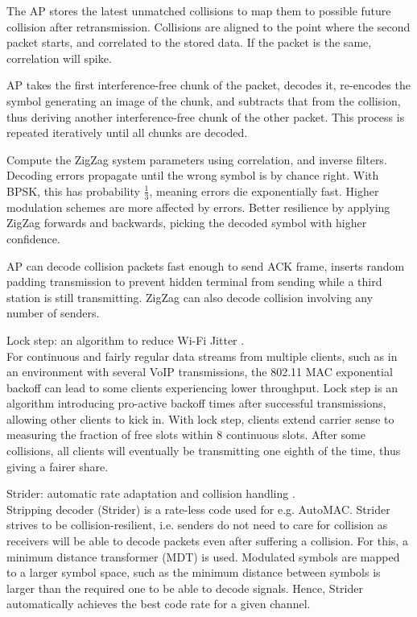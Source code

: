 The AP stores the latest unmatched collisions to map them to possible future collision after retransmission. Collisions are aligned to the point where the second packet starts, and correlated to the stored data. If the packet is the same, correlation will spike.

AP takes the first interference-free chunk of the packet, decodes it, re-encodes the symbol generating an image of the chunk, and subtracts that from the collision, thus deriving another interference-free chunk of the other packet. This process is repeated iteratively until all chunks are decoded.

Compute the ZigZag system parameters using correlation, and inverse filters. Decoding errors propagate until the wrong symbol is by chance right. With BPSK, this has probability $\frac{1}{3}$, meaning errors die exponentially fast. Higher modulation schemes are more affected by errors. Better resilience by applying ZigZag forwards and backwards, picking the decoded symbol with higher confidence.

AP can decode collision packets fast enough to send ACK frame, inserts random padding transmission to prevent hidden terminal from sending while a third station is still transmitting. ZigZag can also decode collision involving any number of senders.

Lock step: an algorithm to reduce Wi-Fi Jitter \cite{lin2009}.\\

For continuous and fairly regular data streams from multiple clients, such as in an environment with several VoIP transmissions, the 802.11 MAC exponential backoff can lead to some clients experiencing lower throughput. Lock step is an algorithm introducing pro-active backoff times after successful transmissions, allowing other clients to kick in. With lock step, clients extend carrier sense to measuring the fraction of free slots within 8 continuous slots. After some collisions, all clients will eventually be transmitting one eighth of the time, thus giving a fairer share.

Strider: automatic rate adaptation and collision handling \cite{gudipati2011}.\\

Stripping decoder (Strider) is a rate-less code used for e.g. AutoMAC. Strider strives to be collision-resilient, i.e. senders do not need to care for collision as receivers will be able to decode packets even after suffering a collision. For this, a minimum distance transformer (MDT) is used. Modulated symbols are mapped to a larger symbol space, such as the minimum distance between symbols is larger than the required one to be able to decode signals. Hence, Strider automatically achieves the best code rate for a given channel.

